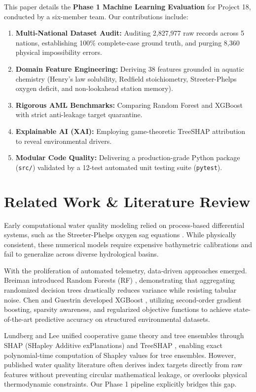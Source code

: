 \documentclass[conference]{IEEEtran}
\begin{document}
This paper details the \textbf{Phase 1 Machine Learning Evaluation} for Project 18, conducted by a six-member team. Our contributions include:
\begin{enumerate}
    \item \textbf{Multi-National Dataset Audit:} Auditing 2,827,977 raw records across 5 nations, establishing 100\% complete-case ground truth, and purging 8,360 physical impossibility errors.
    \item \textbf{Domain Feature Engineering:} Deriving 38 features grounded in aquatic chemistry (Henry's law solubility, Redfield stoichiometry, Streeter-Phelps oxygen deficit, and non-lookahead station memory).
    \item \textbf{Rigorous AML Benchmarks:} Comparing Random Forest and XGBoost with strict anti-leakage target quarantine.
    \item \textbf{Explainable AI (XAI):} Employing game-theoretic TreeSHAP attribution to reveal environmental drivers.
    \item \textbf{Modular Code Quality:} Delivering a production-grade Python package (\texttt{src/}) validated by a 12-test automated unit testing suite (\texttt{pytest}).
\end{enumerate}

\section{Related Work \& Literature Review}
Early computational water quality modeling relied on process-based differential systems, such as the Streeter-Phelps oxygen sag equations \cite{streeter1925study}. While physically consistent, these numerical models require expensive bathymetric calibrations and fail to generalize across diverse hydrological basins.

With the proliferation of automated telemetry, data-driven approaches emerged. Breiman introduced Random Forests (RF) \cite{breiman2001random}, demonstrating that aggregating randomized decision trees drastically reduces variance while resisting tabular noise. Chen and Guestrin developed XGBoost \cite{chen2016xgboost}, utilizing second-order gradient boosting, sparsity awareness, and regularized objective functions to achieve state-of-the-art predictive accuracy on structured environmental datasets.

Lundberg and Lee unified cooperative game theory and tree ensembles through SHAP (SHapley Additive exPlanations) and TreeSHAP \cite{lundberg2017unified, lundberg2020local}, enabling exact polynomial-time computation of Shapley values for tree ensembles. However, published water quality literature often derives index targets directly from raw features without preventing circular mathematical leakage, or overlooks physical thermodynamic constraints. Our Phase 1 pipeline explicitly bridges this gap.
\end{document}
